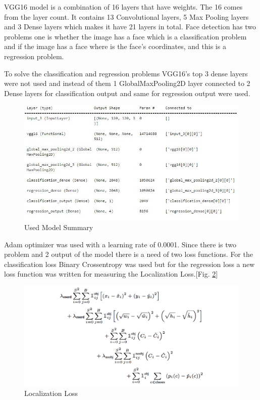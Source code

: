 \documentclass[conference]{IEEEtran}
\begin{document}
\bigskip

VGG16 model is a combination of 16 layers that have weights. The 16 comes from the layer count. It contains 13 Convolutional layers, 5 Max Pooling layers and 3 Dense layers which makes it have 21 layers in total. Face detection has two problems one is whether the image has a face which is a classification problem and if the image has a face where is the face's coordinates, and this is a regression problem. 

\bigskip

To solve the classification and regression problems VGG16's top 3 dense layers were not used and instead of them 1 GlobalMaxPooling2D layer connected to 2 Dense layers for classification output and same for regression output were used. 

\begin{figure}[htbp]
\centering
\includegraphics[scale=0.50]{Model_summary.jpg}
\caption{Used Model Summary}
\label{fig:ModelSummary}
\end{figure}

\bigskip

Adam optimizer was used with a learning rate of 0.0001. Since there is two problem and 2 output of the model there is a need of two loss functions. For the classification loss Binary Crossentropy was used but for the regression loss a new loss function was written for measuring the Localization Loss.[Fig. \ref{fig:LocalizationLoss}]

\begin{figure}[htbp]
\centering
\includegraphics[scale=0.20]{Localization Loss.png}
\caption{Localization Loss}
\label{fig:LocalizationLoss}
\end{figure}
\end{document}
